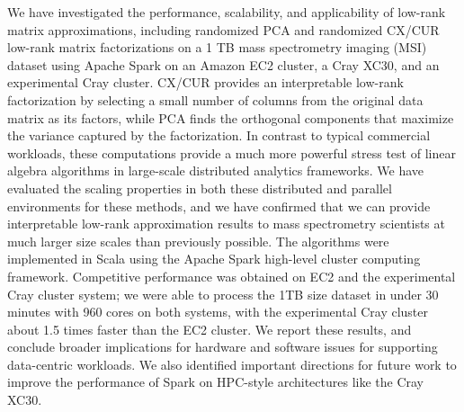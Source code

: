 We have investigated the performance, scalability, and applicability of
low-rank matrix approximations, including randomized PCA and randomized CX/CUR
low-rank matrix factorizations on a 1 TB mass spectrometry imaging (MSI)
dataset using Apache Spark on an Amazon EC2 cluster, a Cray XC30, and an
experimental Cray cluster.  CX/CUR provides an interpretable low-rank
factorization by selecting a small number of columns from the original data
matrix as its factors, while PCA finds the orthogonal components that maximize
the variance captured by the factorization.  In contrast to typical commercial
workloads, these computations provide a much more powerful stress test of
linear algebra algorithms in large-scale distributed analytics frameworks.  We
have evaluated the scaling properties in both these distributed and parallel
environments for these methods, and we have confirmed that we can provide
interpretable low-rank approximation results to mass spectrometry scientists at
much larger size scales than previously possible.  The algorithms were
implemented in Scala using the Apache Spark high-level cluster computing
framework.  Competitive performance was obtained on EC2 and the experimental
Cray cluster system; we were able to process the 1TB size dataset in under 30
minutes with 960 cores on both systems, with the experimental Cray cluster
about 1.5 times faster than the EC2 cluster.  We report these results, and
conclude broader implications for hardware and software issues for supporting
data-centric workloads.  We also identified important directions for future
work to improve the performance of Spark on HPC-style architectures like the
Cray XC30.
